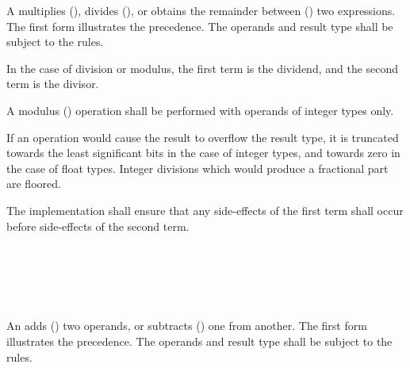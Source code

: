 
\begin{grammar}
 \\
	 \\
	 \terminal{*}  \\
	 \terminal{/}  \\
	 \terminal{\%}  \\
\end{grammar}

\specsubsubitem
A  multiplies (\terminal{*}), divides
(\terminal{/}), or obtains the remainder between (\terminal{\%}) two
expressions. The first form illustrates the precedence. The operands and result
type shall be subject to the  rules.

\specsubsubitem
In the case of division or modulus, the first term is the dividend, and the
second term is the divisor.

\specsubsubitem
A modulus (\terminal{\%}) operation shall be performed with operands of integer
types only.

\specsubsubitem
If an operation would cause the result to overflow the result type, it is
truncated towards the least significant bits in the case of integer types, and
towards zero in the case of float types. Integer divisions which would produce
a fractional part are floored.

\specsubsubitem
The implementation shall ensure that any side-effects of the first term shall
occur before side-effects of the second term.


\begin{grammar}
 \\
	 \\
	 \terminal{+}  \\
	 \terminal{-}  \\
\end{grammar}

\specsubsubitem
An  adds (\terminal{+}) two operands, or
subtracts (\terminal{-}) one from another. The first form illustrates the
precedence. The operands and result type shall be subject to the  rules.

